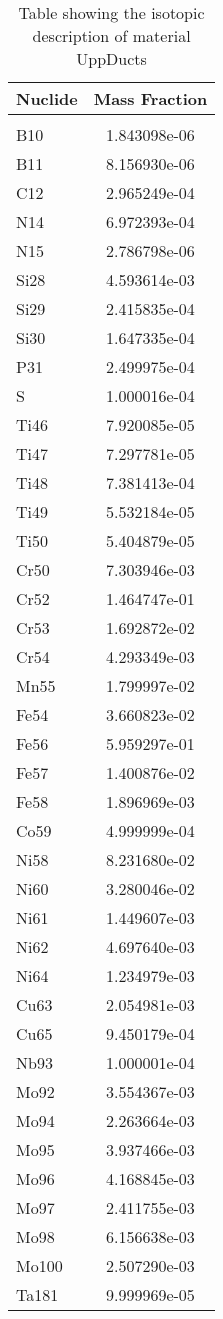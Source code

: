 \begin{centering}
\begin{table}[ht!]
\begin{tabular}{l | c}
\hline
Nuclide & Mass Fraction\\
\hline
\\
B10 & 1.843098e-06\\
B11 & 8.156930e-06\\
C12 & 2.965249e-04\\
N14 & 6.972393e-04\\
N15 & 2.786798e-06\\
Si28 & 4.593614e-03\\
Si29 & 2.415835e-04\\
Si30 & 1.647335e-04\\
P31 & 2.499975e-04\\
S & 1.000016e-04\\
Ti46 & 7.920085e-05\\
Ti47 & 7.297781e-05\\
Ti48 & 7.381413e-04\\
Ti49 & 5.532184e-05\\
Ti50 & 5.404879e-05\\
Cr50 & 7.303946e-03\\
Cr52 & 1.464747e-01\\
Cr53 & 1.692872e-02\\
Cr54 & 4.293349e-03\\
Mn55 & 1.799997e-02\\
Fe54 & 3.660823e-02\\
Fe56 & 5.959297e-01\\
Fe57 & 1.400876e-02\\
Fe58 & 1.896969e-03\\
Co59 & 4.999999e-04\\
Ni58 & 8.231680e-02\\
Ni60 & 3.280046e-02\\
Ni61 & 1.449607e-03\\
Ni62 & 4.697640e-03\\
Ni64 & 1.234979e-03\\
Cu63 & 2.054981e-03\\
Cu65 & 9.450179e-04\\
Nb93 & 1.000001e-04\\
Mo92 & 3.554367e-03\\
Mo94 & 2.263664e-03\\
Mo95 & 3.937466e-03\\
Mo96 & 4.168845e-03\\
Mo97 & 2.411755e-03\\
Mo98 & 6.156638e-03\\
Mo100 & 2.507290e-03\\
Ta181 & 9.999969e-05
\end{tabular}
\caption{Table showing the isotopic description of material UppDucts}
\label{table:material_UppDucts}
\end{table}\clearpage


\end{centering}
